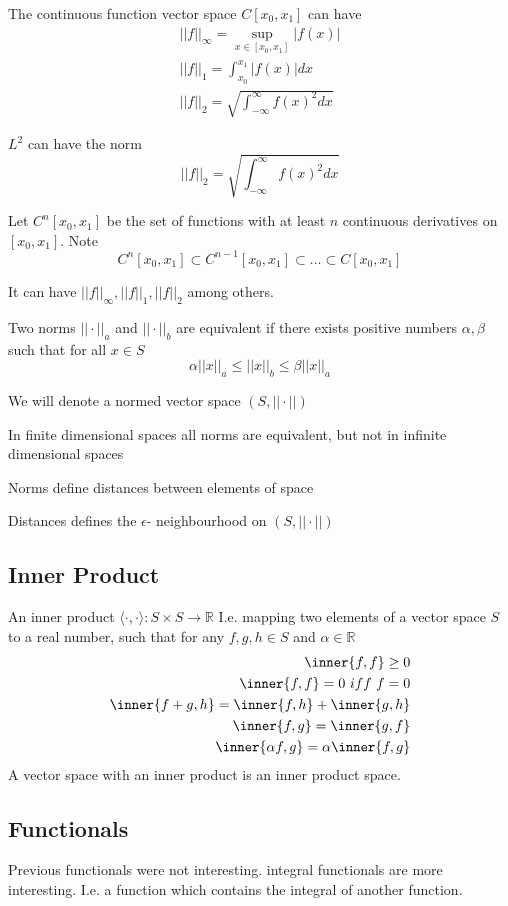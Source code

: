 \documentclass{E:/Documents/Latex/myassignment}
\begin{document}
The continuous function vector space $C[x_0,x_1]$ can have 
\begin{align*}
	||f||_\infty = \sup_{x \in [x_0,x_1]} |f(x)|\\
	||f||_1 = \int_{x_0}^{x_1} |f(x)| dx\\
	||f||_2 = \sqrt{\int_{-\infty}^\infty f(x)^2 dx}	
\end{align*}


$L^2$ can have the norm
\[||f||_2 = \sqrt{\int_{-\infty}^\infty f(x)^2 dx}\]


Let $C^n[x_0,x_1]$ be the set of functions with at least $n$ continuous derivatives on $[x_0,x_1]$. Note
\[C^n[x_0,x_1] \subset C^{n-1}[x_0,x_1] \subset \ldots \subset C[x_0,x_1]\]

It can have $||f||_\infty, ||f||_1, ||f||_2$ among others.

Two norms $||\cdot||_a$ and $||\cdot||_b$ are equivalent if there exists positive numbers $\alpha,\beta$ such that for all $x \in S$
\[\alpha||x||_a \leq ||x||_b \leq \beta ||x||_a\]

We will denote a normed vector space $(S,||\cdot||)$

In finite dimensional spaces all norms are equivalent, but not in infinite dimensional spaces

Norms define distances between elements of space

Distances defines the $\epsilon$- neighbourhood on $(S,||\cdot||)$

\subsection{Inner Product}
An inner product $\langle \cdot,\cdot\rangle : S\times S \to \mathbb{R}$ I.e. mapping two elements of a vector space $S$ to a real number, such that for any $f,g,h\in S$ and $\alpha \in \mathbb{R}$
\begin{align*}
	\inner{f,f} \geq 0\\
	\inner{f,f} = 0 \ iff \ f=0\\
	\inner{f+g,h} = \inner{f,h} + \inner{g,h}\\
	\inner{f,g} = \inner{g,f}\\
	\inner{\alpha f,g} = \alpha\inner{f,g}\\	
\end{align*}
A vector space with an inner product is an inner product space.

\subsection{Functionals}
Previous functionals were not interesting. integral functionals are more interesting. I.e. a function which contains the integral of another function.
\end{document}
